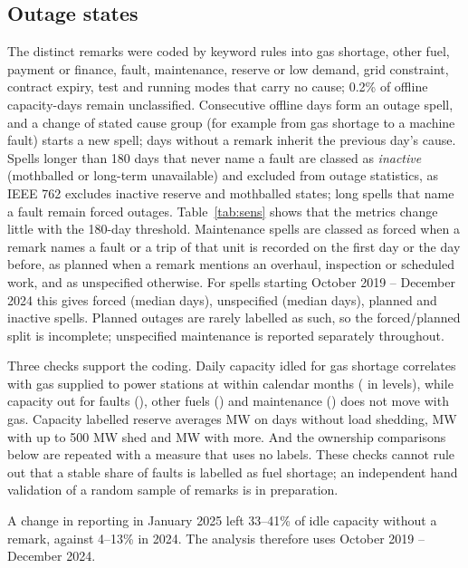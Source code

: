 \documentclass[11pt]{article}
\begin{document}
\subsection{Outage states}
The \nRemarks{} distinct remarks were coded by keyword rules into gas shortage, other fuel, payment or finance, fault, maintenance, reserve or low demand, grid constraint, contract expiry, test and running modes that carry no cause; 0.2\% of offline capacity-days remain unclassified. Consecutive offline days form an outage spell, and a change of stated cause group (for example from gas shortage to a machine fault) starts a new spell; days without a remark inherit the previous day's cause. Spells longer than 180 days that never name a fault are classed as \emph{inactive} (mothballed or long-term unavailable) and excluded from outage statistics, as IEEE 762 excludes inactive reserve and mothballed states; long spells that name a fault remain forced outages. Table~\ref{tab:sens} shows that the metrics change little with the 180-day threshold. Maintenance spells are classed as forced when a remark names a fault or a trip of that unit is recorded on the first day or the day before, as planned when a remark mentions an overhaul, inspection or scheduled work, and as unspecified otherwise. For spells starting October 2019 -- December 2024 this gives \spForced{} forced (median \spForcedMedian{} days), \spMaintunspecified{} unspecified (median \spUnspecMedian{} days), \spPlanned{} planned and \spInactive{} inactive spells. Planned outages are rarely labelled as such, so the forced/planned split is incomplete; unspecified maintenance is reported separately throughout.

Three checks support the coding. Daily capacity idled for gas shortage correlates with gas supplied to power stations at \corrGasFuel{} within calendar months (\corrGasFuelLev{} in levels), while capacity out for faults (\corrGasForced), other fuels (\corrGasOther) and maintenance (\corrGasPlanned) does not move with gas. Capacity labelled reserve averages \resNoShed{} MW on days without load shedding, \resLowShed{} MW with up to 500 MW shed and \resHighShed{} MW with more. And the ownership comparisons below are repeated with a measure that uses no labels. These checks cannot rule out that a stable share of faults is labelled as fuel shortage; an independent hand validation of a random sample of remarks is in preparation.

A change in reporting in January 2025 left 33--41\% of idle capacity without a remark, against 4--13\% in 2024. The analysis therefore uses October 2019 -- December 2024.
\end{document}
